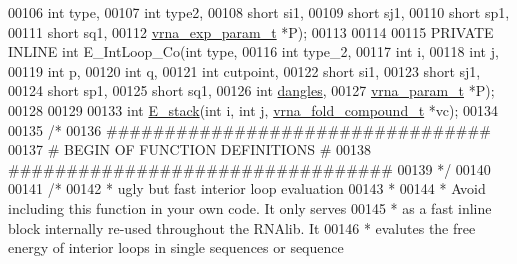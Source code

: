 \begin{DoxyCode}
00106                                         \textcolor{keywordtype}{int} type,
00107                                         \textcolor{keywordtype}{int} type2,
00108                                         \textcolor{keywordtype}{short} si1,
00109                                         \textcolor{keywordtype}{short} sj1,
00110                                         \textcolor{keywordtype}{short} sp1,
00111                                         \textcolor{keywordtype}{short} sq1,
00112                                         \hyperlink{group__energy__parameters_structvrna__exp__param__s}{vrna\_exp\_param\_t} *P);
00113 
00114 
00115 PRIVATE INLINE \textcolor{keywordtype}{int} E\_IntLoop\_Co(\textcolor{keywordtype}{int} type,
00116                                 \textcolor{keywordtype}{int} type\_2,
00117                                 \textcolor{keywordtype}{int} i,
00118                                 \textcolor{keywordtype}{int} j,
00119                                 \textcolor{keywordtype}{int} p,
00120                                 \textcolor{keywordtype}{int} q,
00121                                 \textcolor{keywordtype}{int} cutpoint,
00122                                 \textcolor{keywordtype}{short} si1,
00123                                 \textcolor{keywordtype}{short} sj1,
00124                                 \textcolor{keywordtype}{short} sp1,
00125                                 \textcolor{keywordtype}{short} sq1,
00126                                 \textcolor{keywordtype}{int} \hyperlink{group__model__details_ga72b511ed1201f7e23ec437e468790d74}{dangles},
00127                                 \hyperlink{group__energy__parameters_structvrna__param__s}{vrna\_param\_t} *P);
00128 
00129 
00133 \textcolor{keywordtype}{int} \hyperlink{group__loops_ga98a95d7a76da898b86e7bf459a062fdd}{E\_stack}(\textcolor{keywordtype}{int} i, \textcolor{keywordtype}{int} j, \hyperlink{group__fold__compound_structvrna__fc__s}{vrna\_fold\_compound\_t} *vc);
00134 
00135 \textcolor{comment}{/*}
00136 \textcolor{comment}{#################################}
00137 \textcolor{comment}{# BEGIN OF FUNCTION DEFINITIONS #}
00138 \textcolor{comment}{#################################}
00139 \textcolor{comment}{*/}
00140 
00141 \textcolor{comment}{/*}
00142 \textcolor{comment}{ *  ugly but fast interior loop evaluation}
00143 \textcolor{comment}{ *}
00144 \textcolor{comment}{ *  Avoid including this function in your own code. It only serves}
00145 \textcolor{comment}{ *  as a fast inline block internally re-used throughout the RNAlib. It}
00146 \textcolor{comment}{ *  evalutes the free energy of interior loops in single sequences or sequence}

\end{DoxyCode}
